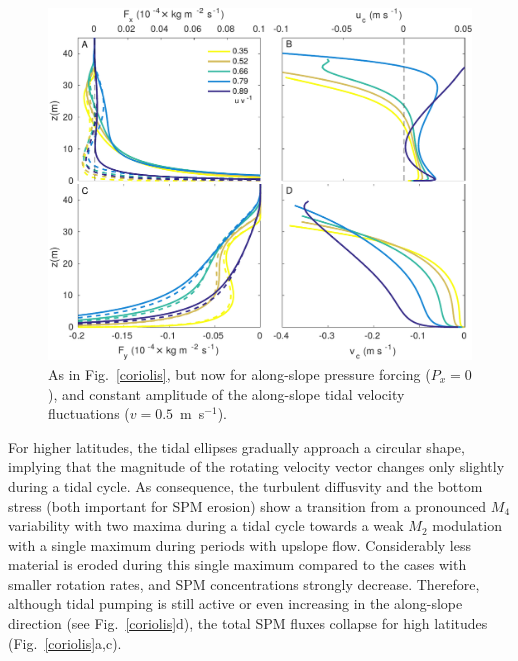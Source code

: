 \begin{figure}
  \noindent\includegraphics[width=30pc]{coriolis2.pdf}
  \caption{As in Fig.\ \ref{coriolis}, but now for along-slope
    pressure forcing ($P_x=0$), and constant amplitude of the
    along-slope tidal velocity fluctuations ($v=0.5$~m~s$^{-1}$).}
  \label{coriolis2}
\end{figure}

For higher latitudes, the tidal ellipses gradually approach a circular
shape, implying that the magnitude of the rotating velocity vector
changes only slightly during a tidal cycle. As consequence, the
turbulent diffusvity and the bottom stress (both important for SPM
erosion) show a transition from a pronounced $M_4$ variability with
two maxima during a tidal cycle towards a weak $M_2$ modulation with a
single maximum during periods with upslope flow. Considerably less
material is eroded during this single maximum compared to the cases
with smaller rotation rates, and SPM concentrations strongly
decrease. Therefore, although tidal pumping is still active or even
increasing in the along-slope direction (see Fig.\ \ref{coriolis}d),
the total SPM fluxes collapse for high latitudes
(Fig.\ \ref{coriolis}a,c).

